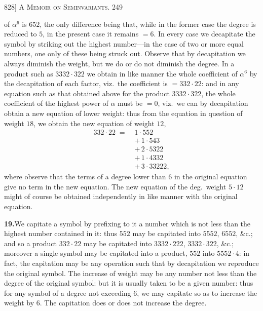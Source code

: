 \documentclass[11pt]{article}
\begin{document}
\newpage
\noindent\textsc{828] \hfill A Memoir on Seminvariants. \hfill 249}
\vspace{0.6em}

\noindent of $\alpha^{6}$ is $652$, the only difference being that, while in the
former case the degree is reduced to $5$, in the present case it remains $=6$. In
every case we decapitate the symbol by striking out the highest number---in the case
of two or more equal numbers, one only of these being struck out. Observe that by
decapitation we always diminish the weight, but we do or do not diminish the degree.
In a product such as $3332\cdot 322$ we obtain in like manner the whole coefficient
of $\alpha^{6}$ by the decapitation of each factor, viz.\ the coefficient is
$=332\cdot 22$: and in any equation such as that obtained above for the product
$3332\cdot 322$, the whole coefficient of the highest power of $\alpha$ must be $=0$,
viz.\ we can by decapitation obtain a new equation of lower weight: thus from the
equation in question of weight $18$, we obtain the new equation of weight $12$,
\[
\begin{aligned}
332\cdot 22 \;=\; & 1\cdot 552 \\
                  & +\,1\cdot 543 \\
                  & +\,2\cdot 5322 \\
                  & +\,1\cdot 4332 \\
                  & +\,3\cdot 33222,
\end{aligned}
\]
where observe that the terms of a degree lower than $6$ in the original equation
give no term in the new equation. The new equation of the deg.\ weight $5\cdot 12$
might of course be obtained independently in like manner with the original equation.

\medskip
\noindent\textbf{19.}\quad We capitate a symbol by prefixing to it a number which is
not less than the highest number contained in it: thus $552$ may be capitated into
$5552$, $6552$, \&c.; and so a product $332\cdot 22$ may be capitated into
$3332\cdot 222$, $3332\cdot 322$, \&c.; moreover a single symbol may be capitated into
a product, $552$ into $5552\cdot 4$: in fact, the capitation may be any operation
such that by decapitation we reproduce the original symbol. The increase of weight
may be any number not less than the degree of the original symbol: but it is usually
taken to be a given number: thus for any symbol of a degree not exceeding $6$, we may
capitate so as to increase the weight by $6$. The capitation does or does not increase
the degree.
\end{document}
